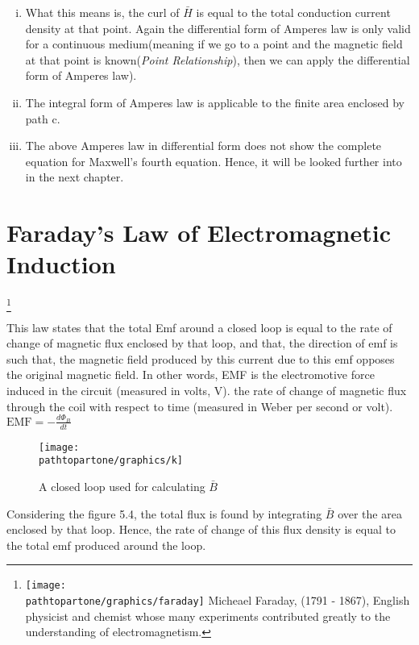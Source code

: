 \begin{enumerate}[(i)]
	\item What this means is, the curl of $\bar{H}$ is equal to the total conduction current density at that point. Again the differential form of Amperes law is only valid for a continuous medium(meaning if we go to a point and the magnetic field at that point is known(\emph{Point Relationship}), then we can apply the differential form of Amperes law).
	\item The integral form of Amperes law is applicable to the finite area enclosed by path c.
	\item The above Amperes law in differential form does not show the complete equation for Maxwell's fourth equation. Hence, it will be looked further into in the next chapter.
\end{enumerate}

\section{Faraday's Law of Electromagnetic Induction} 
\footnote{
\texttt{[image: \\pathtopartone/graphics/faraday]} 
Micheael Faraday, (1791 - 1867), English physicist and chemist whose many experiments contributed greatly to the understanding of electromagnetism.
}

This law states that the total Emf around a closed loop is equal to the rate of change of magnetic flux enclosed by that loop, and that, the direction of emf is such that, the magnetic field produced by this current due to this emf opposes the original magnetic field.
In other words, EMF is the electromotive force induced in the circuit (measured in volts, V). the rate of change of magnetic flux through the coil with respect to time (measured in Weber per second or volt).
$\text{EMF} = -\frac{d\Phi_B}{dt}
$\begin{figure}[h]
	\centering
	\texttt{[image: \\pathtopartone/graphics/k]}
	\caption{A closed loop used for calculating $\bar{B}$}
	\label{fig:k}
\end{figure}

Considering the figure 5.4, the total flux is found by integrating $\bar{B}$ over the area enclosed by that loop. Hence, the rate of change of this flux density is equal to the total emf produced around the loop.


